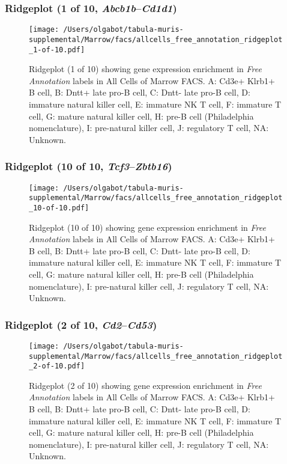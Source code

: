 \clearpage

\subsubsection{Ridgeplot (1 of 10, \emph{Abcb1b}--\emph{Cd1d1})}
\begin{figure}[h]
\centering
\texttt{[image: /Users/olgabot/tabula-muris-supplemental/Marrow/facs/allcells\_free\_annotation\_ridgeplot\_1-of-10.pdf]}

\caption{ Ridgeplot (1 of 10)  showing gene expression enrichment in \emph{Free Annotation} labels in All Cells of Marrow FACS. A: Cd3e+ Klrb1+ B cell, B: Dntt+ late pro-B cell, C: Dntt- late pro-B cell, D: immature natural killer cell, E: immature NK T cell, F: immature T cell, G: mature natural killer cell, H: pre-B cell (Philadelphia nomenclature), I: pre-natural killer cell, J: regulatory T cell, NA: Unknown.}
\end{figure}


\clearpage

\subsubsection{Ridgeplot (10 of 10, \emph{Tcf3}--\emph{Zbtb16})}
\begin{figure}[h]
\centering
\texttt{[image: /Users/olgabot/tabula-muris-supplemental/Marrow/facs/allcells\_free\_annotation\_ridgeplot\_10-of-10.pdf]}

\caption{ Ridgeplot (10 of 10)  showing gene expression enrichment in \emph{Free Annotation} labels in All Cells of Marrow FACS. A: Cd3e+ Klrb1+ B cell, B: Dntt+ late pro-B cell, C: Dntt- late pro-B cell, D: immature natural killer cell, E: immature NK T cell, F: immature T cell, G: mature natural killer cell, H: pre-B cell (Philadelphia nomenclature), I: pre-natural killer cell, J: regulatory T cell, NA: Unknown.}
\end{figure}


\clearpage

\subsubsection{Ridgeplot (2 of 10, \emph{Cd2}--\emph{Cd53})}
\begin{figure}[h]
\centering
\texttt{[image: /Users/olgabot/tabula-muris-supplemental/Marrow/facs/allcells\_free\_annotation\_ridgeplot\_2-of-10.pdf]}

\caption{ Ridgeplot (2 of 10)  showing gene expression enrichment in \emph{Free Annotation} labels in All Cells of Marrow FACS. A: Cd3e+ Klrb1+ B cell, B: Dntt+ late pro-B cell, C: Dntt- late pro-B cell, D: immature natural killer cell, E: immature NK T cell, F: immature T cell, G: mature natural killer cell, H: pre-B cell (Philadelphia nomenclature), I: pre-natural killer cell, J: regulatory T cell, NA: Unknown.}
\end{figure}


